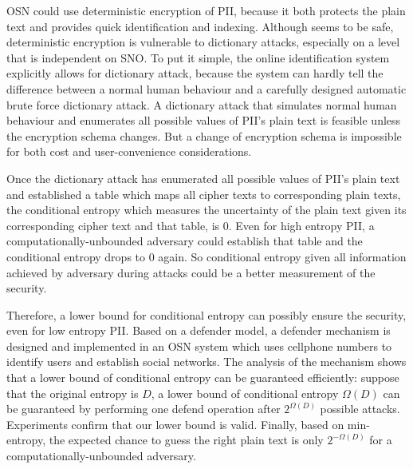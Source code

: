 \documentclass[10pt, conference, compsocconf]{IEEEtran}
\begin{document}

    OSN could use deterministic encryption of PII,
    because it both protects the plain text and provides quick identification
    and indexing.
    Although seems to be safe, deterministic encryption is
    vulnerable to dictionary attacks, especially
    on a level that is independent on SNO.
    To put it simple, the online identification system explicitly
    allows for dictionary attack, because the system can hardly tell
    the difference between a normal human behaviour and a carefully
    designed automatic brute force dictionary attack. A dictionary
    attack that simulates normal human behaviour and enumerates all
    possible values of PII's plain text is feasible unless the encryption
    schema changes. But a change of encryption schema is impossible
    for both cost and user-convenience considerations.

    Once the dictionary attack has enumerated all possible values
    of PII's plain text and established a table which maps all cipher texts
    to corresponding plain texts, the conditional entropy \cite{math_book, info_measure}
    which measures the uncertainty of the plain text given
    its corresponding cipher text and that table, is $0$.
    Even for high entropy PII, a
    computationally-unbounded adversary could establish that table
    and the conditional entropy drops to $0$ again.
    So conditional entropy given
    all information achieved by adversary during attacks
    could be a better measurement of the security.

    Therefore, a lower bound for conditional entropy can possibly ensure
    the security, even for low entropy PII.
    Based on a defender model, a defender mechanism is designed and implemented
    in an OSN system which uses cellphone numbers
    to identify users and establish social networks.
    The analysis of the mechanism shows that a lower bound
    of conditional entropy can be guaranteed efficiently: suppose that the original entropy
    is $D$, a lower bound of conditional entropy $\Omega(D)$ can be guaranteed
    by performing one defend operation after $2^{\Omega(D)}$
    possible attacks.
    Experiments confirm that
    our lower bound is valid. Finally, based on min-entropy,
    the expected chance to guess the right plain text is only $2^{-\Omega(D)}$ for
    a computationally-unbounded adversary.
\end{document}

